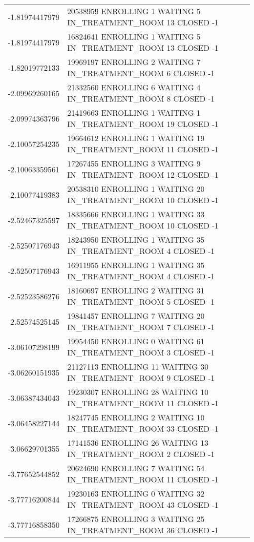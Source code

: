 {\begin{longtable}{|c|p{}|}
-1.81974417979 & 20538959 ENROLLING 1 WAITING 5 IN\_TREATMENT\_ROOM 13 CLOSED -1 \\
-1.81974417979 & 16824641 ENROLLING 1 WAITING 5 IN\_TREATMENT\_ROOM 13 CLOSED -1 \\
-1.82019772133 & 19969197 ENROLLING 2 WAITING 7 IN\_TREATMENT\_ROOM 6 CLOSED -1 \\
\hline
-2.09969260165 & 21332560 ENROLLING 6 WAITING 4 IN\_TREATMENT\_ROOM 8 CLOSED -1 \\
-2.09974363796 & 21419663 ENROLLING 1 WAITING 1 IN\_TREATMENT\_ROOM 19 CLOSED -1 \\
-2.10057254235 & 19664612 ENROLLING 1 WAITING 19 IN\_TREATMENT\_ROOM 11 CLOSED -1 \\
-2.10063359561 & 17267455 ENROLLING 3 WAITING 9 IN\_TREATMENT\_ROOM 12 CLOSED -1 \\
-2.10077419383 & 20538310 ENROLLING 1 WAITING 20 IN\_TREATMENT\_ROOM 10 CLOSED -1 \\
\hline
-2.52467325597 & 18335666 ENROLLING 1 WAITING 33 IN\_TREATMENT\_ROOM 10 CLOSED -1 \\
-2.52507176943 & 18243950 ENROLLING 1 WAITING 35 IN\_TREATMENT\_ROOM 4 CLOSED -1 \\
-2.52507176943 & 16911955 ENROLLING 1 WAITING 35 IN\_TREATMENT\_ROOM 4 CLOSED -1 \\
-2.52523586276 & 18160697 ENROLLING 2 WAITING 31 IN\_TREATMENT\_ROOM 5 CLOSED -1 \\
-2.52574525145 & 19841457 ENROLLING 7 WAITING 20 IN\_TREATMENT\_ROOM 7 CLOSED -1 \\
\hline
-3.06107298199 & 19954450 ENROLLING 0 WAITING 61 IN\_TREATMENT\_ROOM 3 CLOSED -1 \\
-3.06260151935 & 21127113 ENROLLING 11 WAITING 30 IN\_TREATMENT\_ROOM 9 CLOSED -1 \\
-3.06387434043 & 19230307 ENROLLING 28 WAITING 10 IN\_TREATMENT\_ROOM 11 CLOSED -1 \\
-3.06458227144 & 18247745 ENROLLING 2 WAITING 10 IN\_TREATMENT\_ROOM 33 CLOSED -1 \\
-3.06629701355 & 17141536 ENROLLING 26 WAITING 13 IN\_TREATMENT\_ROOM 2 CLOSED -1 \\
\hline
-3.77652544852 & 20624690 ENROLLING 7 WAITING 54 IN\_TREATMENT\_ROOM 11 CLOSED -1 \\
-3.77716200844 & 19230163 ENROLLING 0 WAITING 32 IN\_TREATMENT\_ROOM 43 CLOSED -1 \\
-3.77716858350 & 17266875 ENROLLING 3 WAITING 25 IN\_TREATMENT\_ROOM 36 CLOSED -1 \\

\end{longtable}}
